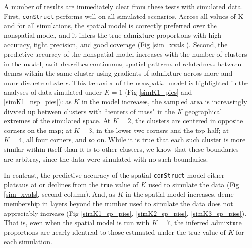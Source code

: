 \documentclass[12pt]{article}
\newcommand{\gb}[1]{{\it\color{magenta}{(#1)}}}
\begin{document}
A number of results are immediately clear from these tests with simulated data.
First, \texttt{conStruct} performs well on all simulated scenarios.
Across all values of K and for all simulations, 
the spatial model is correctly preferred over the nonspatial model, 
and it infers the true admixture proportions with high accuracy, tight precision, and good coverage 
(Fig \ref{sim_xvals}).
Second, the predictive accuracy of the nonspatial model increases 
with the number of clusters in the model, 
as it describes continuous, spatial patterns of relatedness between demes within the same cluster 
using gradients of admixture across more and more discrete clusters.
This behavior of the nonspatial model is highlighted in 
the analyses of data simulated under $K=1$ (Fig \ref{simK1_pies} and \ref{simK1_nsp_pies}):
as $K$ in the model increases, 
the sampled area is increasingly divvied up between clusters 
with ``centers of mass" in the $K$ geographical extremes of the simulated space.
At $K=2$, the clusters are centered in opposite corners on the map; 
at $K=3$, in the lower two corners and the top half; 
at $K=4$, all four corners, and so on.
While it is true that each such cluster is more similar within itself
than it is to other clusters,
we know that these boundaries are arbitray,
since the data were simulated with no such boundaries.

In contrast, the predictive accuracy of the spatial \texttt{conStruct} model
either plateaus at or declines from the true value of $K$ used to simulate the data (Fig \ref{sim_xvals}, second column).
And, as $K$ in the spatial model increases, 
deme membership in layers beyond the number used to simulate the data does not appreciably increase 
(Fig \ref{simK1_sp_pies}, \ref{simK2_sp_pies}, \ref{simK3_sp_pies}).
That is, even when the spatial model is run with $K=7$, 
the inferred admixture proportions are nearly identical to 
those estimated under the true value of $K$ for each simulation.

\gb{could talk about proportion of relatedness explained by each layer here.
e.g., Another way to visualize the difference in the behavior of the spatial and nonspatial models 
is to summarize the proportion of relatedness between samples explained by each cluster...}
\end{document}
